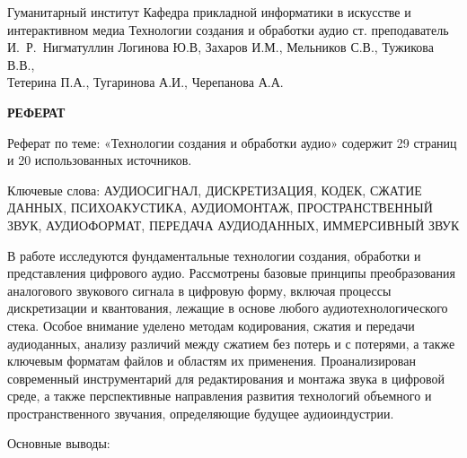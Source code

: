 \documentclass{SibFU-docs}
\begin{document}
\renewcommand{\contentsname}{}
\mycovertitle
{Гуманитарный институт}
{Кафедра прикладной информатики в искусстве и интерактивном медиа}
{Технологии создания и обработки аудио}
{ст. преподаватель И.~Р.~Нигматуллин}
{Логинова Ю.В, Захаров И.М., Мельников С.В., Тужикова В.В.,\\Тетерина П.А., Тугаринова А.И., Черепанова А.А.}
 
\begin{center}
\bfseries РЕФЕРАТ
\end{center}
\noindent

Реферат по теме: «Технологии создания и обработки аудио» содержит 29 страниц и 20 использованных источников.

Ключевые слова: АУДИОСИГНАЛ, ДИСКРЕТИЗАЦИЯ, КОДЕК, СЖАТИЕ ДАННЫХ, ПСИХОАКУСТИКА, АУДИОМОНТАЖ, ПРОСТРАНСТВЕННЫЙ ЗВУК, АУДИОФОРМАТ, ПЕРЕДАЧА АУДИОДАННЫХ, ИММЕРСИВНЫЙ ЗВУК

В работе исследуются фундаментальные технологии создания, обработки и представления цифрового аудио. Рассмотрены базовые принципы преобразования аналогового звукового сигнала в цифровую форму, включая процессы дискретизации и квантования, лежащие в основе любого аудиотехнологического стека. Особое внимание уделено методам кодирования, сжатия и передачи аудиоданных, анализу различий между сжатием без потерь и с потерями, а также ключевым форматам файлов и областям их применения. Проанализирован современный инструментарий для редактирования и монтажа звука в цифровой среде, а также перспективные направления развития технологий объемного и пространственного звучания, определяющие будущее аудиоиндустрии.

Основные выводы:
\end{document}
